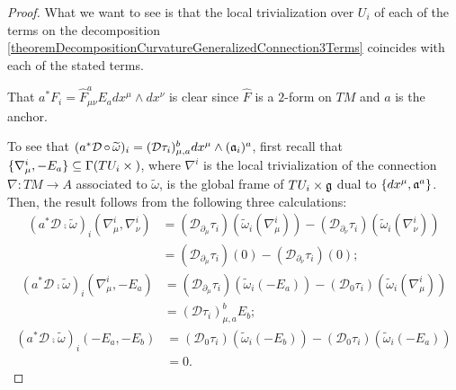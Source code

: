 \begin{proof}
What we want to see is that the local trivialization over $U_i$ of each of the terms on the decomposition \ref{theoremDecompositionCurvatureGeneralizedConnection3Terms} coincides with each of the stated terms.

That $a^*F_i = \hat F^a_{\mu \nu} E_a dx^\mu \wedge dx^\nu$ is clear since $\hat F$ is a $2$-form on $TM$ and $a$ is the anchor.

To see that $(a^* \mathcal D \operatorname{\circ} \widetilde \omega)_i = (\mathcal D \tau_i)^b_{\mu, a} dx^\mu \wedge (\mathfrak{a}_i)^a$, first recall that $\{\nabla^i_\mu, -E_a\} \subseteq \Gamma(TU_i \times \mathfrak{)}$, where $\nabla^i$ is the local trivialization of the connection $\nabla:TM \to A$ associated to $\tilde \omega$, is the global frame of $TU_i \times \mathfrak{g}$ dual to $\{dx^\mu, \mathfrak{a}^a\}$. Then, the result follows from the following three calculations:
\begin{align*}
    (a^* \mathcal D \comp \tilde \omega)_i(\nabla^i_\mu, \nabla^i_\nu) 
        &= (\mathcal D_{\partial_\mu} \tau_i) (\tilde \omega_i(\nabla^i_\mu)) - (\mathcal D_{\partial_\nu} \tau_i) (\tilde \omega_i(\nabla^i_\nu))\\
        &= (\mathcal D_{\partial_\mu} \tau_i) (0) - (\mathcal D_{\partial_\nu} \tau_i)(0);
\end{align*}
\begin{align*}
    (a^* \mathcal D \comp \tilde \omega)_i(\nabla^i_\mu, -E_a) 
        &= (\mathcal D_{\partial_\mu} \tau_i) (\tilde \omega_i(-E_a)) - (\mathcal D_{0} \tau_i) (\tilde \omega_i(\nabla^i_\mu))\\
        &= (\mathcal D \tau_i)^b_{\mu, a} E_b;
\end{align*}
\begin{align*}
    (a^* \mathcal D \comp \tilde \omega)_i(-E_a, -E_b) 
        &= (\mathcal D_{0} \tau_i) (\tilde \omega_i(-E_b)) - (\mathcal D_{0} \tau_i) (\tilde \omega_i(-E_a))\\
        &= 0.
\end{align*}


\end{proof}
